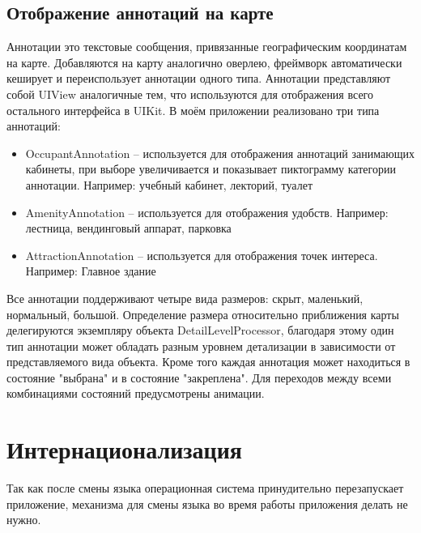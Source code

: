     \subsection{Отображение аннотаций на карте}
      Аннотации это текстовые сообщения, привязанные географическим координатам на карте. Добавляются на карту аналогично оверлею, фреймворк автоматически кеширует и переиспользует аннотации одного типа. Аннотации представляют собой UIView аналогичные тем, что используются для отображения всего остального интерфейса в UIKit.
      В моём приложении реализовано три типа аннотаций:
      \begin{itemize}
        \item OccupantAnnotation -- используется для отображения аннотаций занимающих кабинеты, при выборе увеличивается и показывает пиктограмму категории аннотации. Например: учебный кабинет, лекторий, туалет
        \item AmenityAnnotation -- используется для отображения удобств. Например: лестница, вендинговый аппарат, парковка
        \item AttractionAnnotation -- используется для отображения точек интереса. Например: Главное здание
      \end{itemize}


      Все аннотации поддерживают четыре вида размеров: скрыт, маленький, нормальный, большой. Определение размера относительно приближения карты делегируются экземпляру объекта DetailLevelProcessor, благодаря этому один тип аннотации может обладать разным уровнем детализации в зависимости от представляемого вида объекта. Кроме того каждая аннотация может находиться в состояние "выбрана" и в состояние "закреплена". Для переходов между всеми комбинациями состояний предусмотрены анимации.


  \section{Интернационализация}
    Так как после смены языка операционная система принудительно перезапускает приложение, механизма для смены языка во время работы приложения делать не нужно.


